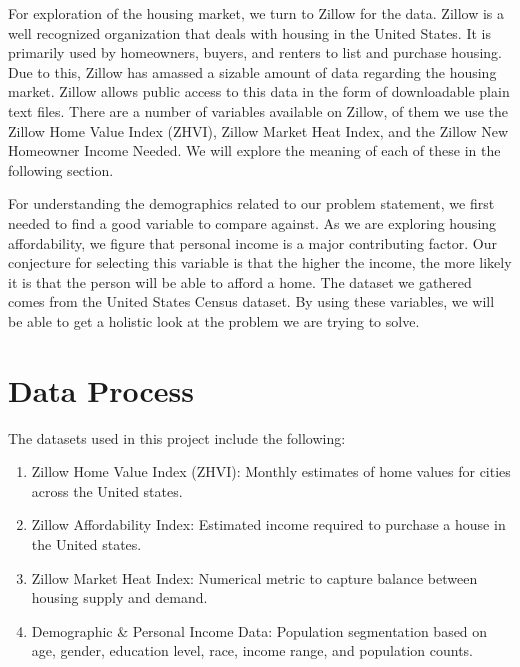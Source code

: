 \documentclass[journal]{IEEEtran}
\begin{document}
For exploration of the housing market, we turn to Zillow for the data. Zillow
is a well recognized organization that deals with housing in the United States.
It is primarily used by homeowners, buyers, and renters to list and purchase
housing. Due to this, Zillow has amassed a sizable amount of data regarding the
housing market. Zillow allows public access to this data in the form of
downloadable plain text files. There are a number of variables available on
Zillow, of them we use the Zillow Home Value Index (ZHVI), Zillow Market Heat
Index, and the Zillow New Homeowner Income Needed. We will explore the meaning
of each of these in the following section.

For understanding the demographics related to our problem statement, we first
needed to find a good variable to compare against. As we are exploring housing
affordability, we figure that personal income is a major contributing factor.
Our conjecture for selecting this variable is that the higher the income, the
more likely it is that the person will be able to afford a home. The dataset we
gathered comes from the United States Census dataset. By using these variables,
we will be able to get a holistic look at the problem we are trying to solve.

\section{Data Process}
The datasets used in this project include the following:
\begin{enumerate}

	\item Zillow Home Value Index (ZHVI): Monthly estimates of home values for
	      cities across  the United states.

	\item Zillow Affordability Index: Estimated income required to purchase a
	      house in the United states.

	\item Zillow Market Heat Index: Numerical metric to capture balance between
	      housing supply and demand.

	\item Demographic \& Personal Income Data: Population segmentation based on
	      age, gender, education level, race, income range, and population counts.

\end{enumerate}
\end{document}
